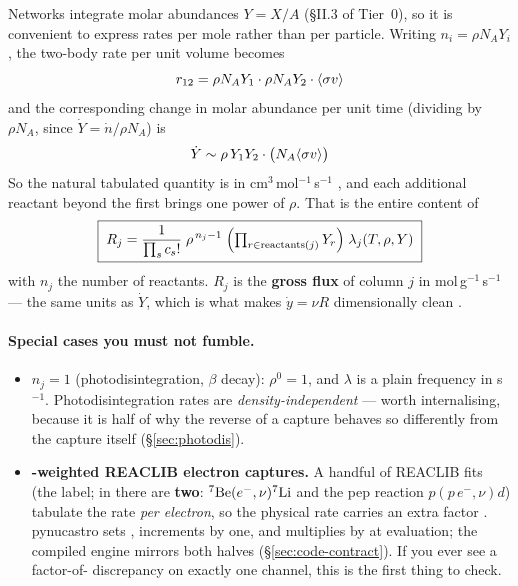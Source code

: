 Networks integrate molar abundances $Y = X/A$ (\S II.3 of Tier~0), so it is
convenient to express rates per mole rather than per particle. Writing
$n_i = \rho N_A Y_i$, the two-body rate per unit volume becomes
%
\begin{equation*}
r_{12} = \rho N_A Y_1 \cdot \rho N_A Y_2 \cdot \sigv
\end{equation*}
%
and the corresponding change in molar abundance per unit time (dividing by
$\rho N_A$, since $\dot Y = \dot n/\rho N_A$) is
%
\begin{equation*}
\dot Y \sim \rho\,Y_1 Y_2 \cdot \bigl(\Nasigv\bigr)
\end{equation*}
%
So the natural tabulated quantity is \textbf{\Nasigv} in
cm$^3$\,mol$^{-1}$\,s$^{-1}$ \citep{cyburt2010}, and each additional reactant
beyond the first brings one power of $\rho$. That is the entire content of
%
\begin{equation}
\boxed{\;
R_j = \frac{1}{\prod_s c_s!}\;\rho^{\,n_j-1}\;
\Bigl(\textstyle\prod_{r\in\text{reactants}(j)} Y_r\Bigr)\;\lambda_j(T,\rho,Y)
\;}
\label{eq:grossflux}
\end{equation}
%
with $n_j$ the number of reactants. $R_j$ is the \textbf{gross flux} of column
$j$ in mol\,g$^{-1}$\,s$^{-1}$ --- the same units as $\dot Y$, which is what
makes $\dot y = \nu R$ dimensionally clean \citep[eq.~2]{cyburt2010}.

\paragraph{Special cases you must not fumble.}

\begin{itemize}
\item \textbf{$n_j = 1$} (photodisintegration, $\beta$ decay): $\rho^0 = 1$, and
      $\lambda$ is a plain frequency in s$^{-1}$. Photodisintegration rates are
      \emph{density-independent} --- worth internalising, because it is half of
      why the reverse of a capture behaves so differently from the capture
      itself (\S\ref{sec:photodis}).

\item \textbf{\Ye-weighted REACLIB electron captures.} A handful of REACLIB fits
      (the  label; in  there are \textbf{two}:
      $\nuc{Be}{7}(e^-,\nu)\nuc{Li}{7}$ and the pep reaction
      $p(p\,e^-,\nu)d$) tabulate the rate \emph{per electron}, so the physical
      rate carries an extra factor \rhoye. pynucastro sets
      , increments  by one, and
      multiplies by \Ye{} at evaluation; the compiled engine mirrors both halves
      (\S\ref{sec:code-contract}). If you ever see a factor-of-\rhoye{}
      discrepancy on exactly one channel, this is the first thing to check.
\end{itemize}

